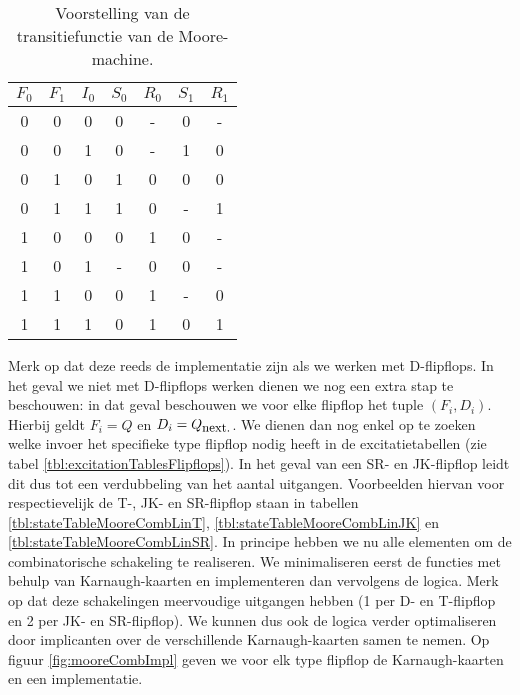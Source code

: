 \begin{table}[hbt]
{\begin{tabular}{ccc|cccc}
$F_0$&$F_1$&$I_0$&$S_0$&$R_0$&$S_1$&$R_1$\\\hline
0&0&0&0&-&0&-\\
0&0&1&0&-&1&0\\
0&1&0&1&0&0&0\\
0&1&1&1&0&-&1\\
1&0&0&0&1&0&-\\
1&0&1&-&0&0&-\\
1&1&0&0&1&-&0\\
1&1&1&0&1&0&1
\end{tabular}
}
\caption{Voorstelling van de transitiefunctie van de Moore-machine.}
\end{table}
Merk op dat deze reeds de implementatie zijn als we werken met D-flipflops. In het geval we niet met D-flipflops werken dienen we nog een extra stap te beschouwen: in dat geval beschouwen we voor elke flipflop het tuple $\left(F_i,D_i\right)$. Hierbij geldt $F_i=Q$ en $D_i=Q_{\mbox{\small{next.}}}$. We dienen dan nog enkel op te zoeken welke invoer het specifieke type flipflop nodig heeft in de excitatietabellen (zie tabel \ref{tbl:excitationTablesFlipflops}). In het geval van een SR- en JK-flipflop leidt dit dus tot een verdubbeling van het aantal uitgangen. Voorbeelden hiervan voor respectievelijk de T-, JK- en SR-flipflop staan in tabellen \ref{tbl:stateTableMooreCombLinT}, \ref{tbl:stateTableMooreCombLinJK} en \ref{tbl:stateTableMooreCombLinSR}. In principe hebben we nu alle elementen om de combinatorische schakeling te realiseren. We minimaliseren eerst de functies met behulp van Karnaugh-kaarten en implementeren dan vervolgens de logica. Merk op dat deze schakelingen meervoudige uitgangen hebben (1 per D- en T-flipflop en 2 per JK- en SR-flipflop). We kunnen dus ook de logica verder optimaliseren door implicanten over de verschillende Karnaugh-kaarten samen te nemen. Op figuur \ref{fig:mooreCombImpl} geven we voor elk type flipflop de Karnaugh-kaarten en een implementatie.
